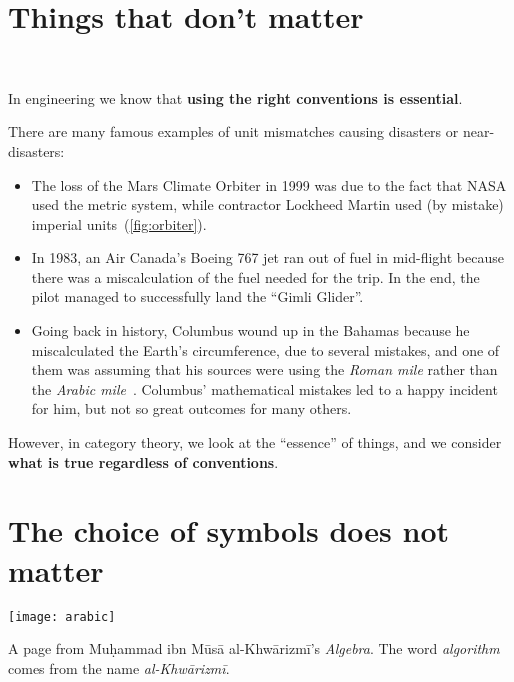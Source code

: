 
\section{Things that don't matter}

\begin{marginfigure}
     \\
    \caption{}
    \label{fig:orbiter}
\end{marginfigure}

In engineering we know that \textbf{using the right conventions is essential}.

There are many famous examples of unit mismatches causing disasters or near-disasters:
\begin{itemize}
    \item The loss of the Mars Climate Orbiter in 1999 was due to the fact that NASA used the metric system,
          while contractor Lockheed Martin used (by mistake) imperial units~(\cref{fig:orbiter}).
    \item In 1983, an Air Canada’s Boeing 767 jet ran out of fuel in mid-flight because there was a miscalculation of the fuel needed for the trip.
          In the end, the pilot managed to successfully land the ``Gimli Glider''.
    \item Going back in history, Columbus wound up in the Bahamas because he miscalculated the Earth's circumference, due to several mistakes, and one of them was assuming that his sources were using the \emph{Roman mile} rather than the \emph{Arabic mile}~\cite{morison2007admiral}.
          Columbus' mathematical mistakes led to a happy incident for him, but not so great outcomes for many others.
\end{itemize}

However, in category theory, we look at the ``essence'' of things, and we consider \textbf{what is true regardless of conventions}.

\section[Choice of symbols]{The choice of symbols does not matter}

\begin{marginfigure}
    \centering
    \texttt{[image: arabic]}
    \caption{A page from Mu\d{h}ammad ibn Mūsā al-Khwārizmī's \emph{Algebra}.
        The word \emph{algorithm} comes from the name \emph{al-Khwārizmī}.
    }
\end{marginfigure}

